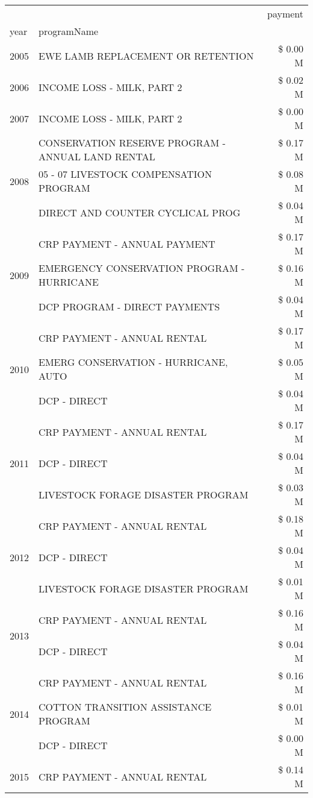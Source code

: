 \begin{tabular}{llr}
\toprule
 &  & payment \\
year & programName &  \\
\midrule
2005 & EWE LAMB REPLACEMENT OR RETENTION & \$ 0.00 M \\
\cline{1-3}
2006 & INCOME LOSS - MILK, PART 2 & \$ 0.02 M \\
\cline{1-3}
2007 & INCOME LOSS - MILK, PART 2 & \$ 0.00 M \\
\cline{1-3}
\multirow[t]{3}{*}{2008} & CONSERVATION RESERVE PROGRAM - ANNUAL LAND RENTAL & \$ 0.17 M \\
 & 05 - 07 LIVESTOCK COMPENSATION PROGRAM & \$ 0.08 M \\
 & DIRECT AND COUNTER CYCLICAL PROG & \$ 0.04 M \\
\cline{1-3}
\multirow[t]{3}{*}{2009} & CRP PAYMENT - ANNUAL PAYMENT & \$ 0.17 M \\
 & EMERGENCY CONSERVATION PROGRAM - HURRICANE & \$ 0.16 M \\
 & DCP PROGRAM - DIRECT PAYMENTS & \$ 0.04 M \\
\cline{1-3}
\multirow[t]{3}{*}{2010} & CRP PAYMENT - ANNUAL RENTAL & \$ 0.17 M \\
 & EMERG CONSERVATION - HURRICANE, AUTO & \$ 0.05 M \\
 & DCP - DIRECT & \$ 0.04 M \\
\cline{1-3}
\multirow[t]{3}{*}{2011} & CRP PAYMENT - ANNUAL RENTAL & \$ 0.17 M \\
 & DCP - DIRECT & \$ 0.04 M \\
 & LIVESTOCK FORAGE DISASTER PROGRAM & \$ 0.03 M \\
\cline{1-3}
\multirow[t]{3}{*}{2012} & CRP PAYMENT - ANNUAL RENTAL & \$ 0.18 M \\
 & DCP - DIRECT & \$ 0.04 M \\
 & LIVESTOCK FORAGE DISASTER PROGRAM & \$ 0.01 M \\
\cline{1-3}
\multirow[t]{2}{*}{2013} & CRP PAYMENT - ANNUAL RENTAL & \$ 0.16 M \\
 & DCP - DIRECT & \$ 0.04 M \\
\cline{1-3}
\multirow[t]{3}{*}{2014} & CRP PAYMENT - ANNUAL RENTAL & \$ 0.16 M \\
 & COTTON TRANSITION ASSISTANCE PROGRAM & \$ 0.01 M \\
 & DCP - DIRECT & \$ 0.00 M \\
\cline{1-3}
\multirow[t]{2}{*}{2015} & CRP PAYMENT - ANNUAL RENTAL & \$ 0.14 M \\

\end{tabular}

